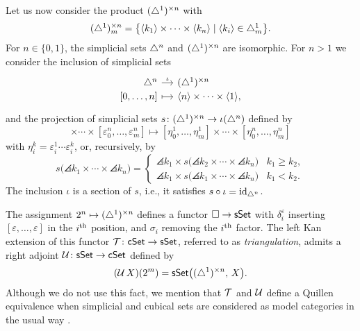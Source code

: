 Let us now consider the product $(\triangle^1)^{\times n}$ with
\begin{equation*}
(\triangle^1)^{\times n}_m = \big\{ \langle k_1 \rangle \times \cdots \times \langle k_n \rangle \mid \langle k_i \rangle \in \triangle^1_m \big\}.
\end{equation*}
For $n \in \{0,1\}$, the simplicial sets $\triangle^n$ and $(\triangle^1)^{\times n}$ are isomorphic.
For $n > 1$ we consider the inclusion of simplicial sets
\begin{equation*}
\begin{tikzcd}[row sep=-3pt, column sep=small,
/tikz/column 1/.append style={anchor=base east},
/tikz/column 2/.append style={anchor=base west}]
\simplex^n \arrow[r, "\iota"] & \scube{n} \\
{[0, \dots, n]} \arrow[r, mapsto] & \angles{n} \times \cdots \times \angles{1},
\end{tikzcd}
\end{equation*}
and the projection of simplicial sets $s \colon (\triangle^1)^{\times n} \to \iota(\triangle^n)$ defined by
\begin{equation*}
[ \varepsilon_0^1, \dots, \varepsilon_m^1] \times \cdots \times [ \varepsilon_0^n, \dots, \varepsilon_m^n] \mapsto [ \eta_0^1, \dots, \eta_m^1] \times \cdots \times [ \eta_0^n, \dots, \eta_m^n]
\end{equation*}
with $\eta_i^k = \varepsilon_i^1 \cdots \varepsilon_i^k$, or, recursively, by
\begin{equation*}
s\big(\angles{k_1} \times \cdots \times \angles{k_n}\big) =
\begin{cases}
\angles{k_1} \times s\big(\angles{k_2} \times \cdots \times \angles{k_n}\big) & k_1 \geq k_2, \\
\angles{k_1} \times s\big(\angles{k_1} \times \cdots \times \angles{k_n}\big) & k_1 < k_2.
\end{cases}
\end{equation*} 
The inclusion $\iota$ is a section of $s$, i.e., it satisfies $s \circ \iota = \mathrm{id}_{\triangle^n}$.

The assignment $2^n \mapsto (\triangle^1)^{\times n}$ defines a functor $\square \to \mathsf{sSet}$ with $\delta_i^\varepsilon$ inserting $[\varepsilon, \dots, \varepsilon]$ in the $i^\mathrm{th}$ position, and $\sigma_i$ removing the $i^\mathrm{th}$ factor.
The left Kan extension of this functor $\operatorname{\mathcal{T}} \colon \mathsf{cSet} \to \mathsf{sSet}$, referred to as \textit{triangulation}, admits a right adjoint $\operatorname{\mathcal{U}} \colon \mathsf{sSet} \to \mathsf{cSet}$ defined by
\begin{equation*}
(\operatorname{\mathcal{U}} X)(2^m) = \mathsf{sSet} \big( (\triangle^1)^{\times n}, \, X \big).
\end{equation*}
Although we do not use this fact, we mention that $\operatorname{\mathcal{T}}$ and $\operatorname{\mathcal{U}}$ define a Quillen equivalence when simplicial and cubical sets are considered as model categories in the usual way \cite[8.4.30]{cisinski2006presheaves}.

